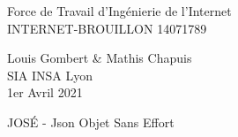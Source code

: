 \documentclass[french]{article}
\newcommand{\rfcId}{14071789}
\newcommand{\rfcTitle}{JOSÉ - Json Objet Sans Effort}
\newcommand{\rfcAuthor}{Louis Gombert \& Mathis Chapuis}
\newcommand{\rfcDate}{1er Avril 2021}
\newcommand{\rfcInstitution}{SIA INSA Lyon}
\begin{document}
\begin{multicols}{2}
	\begin{flushleft}
		Force de Travail d'Ingénierie de l'Internet \\
		INTERNET-BROUILLON \rfcId
	\end{flushleft}
\columnbreak
	\begin{flushright}
		\rfcAuthor \\
		\rfcInstitution \\
		\rfcDate
	\end{flushright}
\end{multicols}

\vspace{1in} { \center \rfcTitle \\ } \vspace{1in}


\begin{abstract}
	Pour défendre le drapeau tricolore dans le monde du numérique et faire face à l'hyperpuissance américaine qui fait parler de  ou de  à des dijonnais, nous proposons un nouveau format de données pour faire renouer la  avec la langue de ses ancêtres. Ainsi, l'utilisation du JOSÉ remplace le format anglo-saxon  dans tous les logiciels écrits dans l'hexagone.
\end{abstract}
\end{document}
